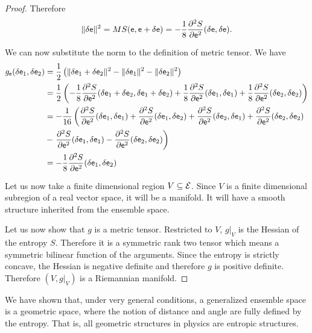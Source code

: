 \begin{proof}
Therefore
$$ \lVert \delta \mathsf{e} \rVert^2 = MS(\mathsf{e}, \mathsf{e} + \delta \mathsf{e}) = - \frac{1}{8} \frac{\partial^2 S}{\partial \mathsf{e}^2} (\delta \mathsf{e}, \delta \mathsf{e}).$$

We can now substitute the norm to the definition of metric tensor. We have
\begin{equation}
	\begin{aligned}
		g_{\mathsf{e}}(\delta \mathsf{e}_1, \delta \mathsf{e}_2 ) &= \frac{1}{2} \left( \lVert \delta \mathsf{e}_1 + \delta \mathsf{e}_2 \rVert^2 - \lVert \delta \mathsf{e}_1 \rVert^2 - \lVert \delta \mathsf{e}_2 \rVert^2 \right) \\
		&= \frac{1}{2} \left( - \frac{1}{8} \frac{\partial^2 S}{\partial \mathsf{e}^2} (\delta \mathsf{e}_1 + \delta \mathsf{e}_2, \delta \mathsf{e}_1 + \delta \mathsf{e}_2) + \frac{1}{8} \frac{\partial^2 S}{\partial \mathsf{e}^2} (\delta \mathsf{e}_1, \delta \mathsf{e}_1) +\frac{1}{8} \frac{\partial^2 S}{\partial \mathsf{e}^2} (\delta \mathsf{e}_2, \delta \mathsf{e}_2) \right) \\
		&= - \frac{1}{16} \left(  \frac{\partial^2 S}{\partial \mathsf{e}^2} (\delta \mathsf{e}_1, \delta \mathsf{e}_1) + \frac{\partial^2 S}{\partial \mathsf{e}^2} (\delta \mathsf{e}_1, \delta \mathsf{e}_2) + \frac{\partial^2 S}{\partial \mathsf{e}^2} (\delta \mathsf{e}_2, \delta \mathsf{e}_1) + \frac{\partial^2 S}{\partial \mathsf{e}^2} (\delta \mathsf{e}_2, \delta \mathsf{e}_2) \right. \\
		&-  \left. \frac{\partial^2 S}{\partial \mathsf{e}^2} (\delta \mathsf{e}_1, \delta \mathsf{e}_1) - \frac{\partial^2 S}{\partial \mathsf{e}^2} (\delta \mathsf{e}_2, \delta \mathsf{e}_2) \right) \\
		&= - \frac{1}{8} \frac{\partial^2 S}{\partial \mathsf{e}^2} (\delta \mathsf{e}_1, \delta \mathsf{e}_2) \\
	\end{aligned}
\end{equation}

	Let us now take a finite dimensional region $V \subseteq \mathcal{E}$. Since $V$ is a finite dimensional subregion of a real vector space, it will be a manifold. It will have a smooth structure inherited from the ensemble space.
	
	Let us now show that $g$ is a metric tensor. Restricted to $V$, $g|_V$ is the Hessian of the entropy $S$. Therefore it is a symmetric rank two tensor which means a symmetric bilinear function of the arguments. Since the entropy is strictly concave, the Hessian is negative definite and therefore $g$ is positive definite. Therefore $(V, g|_V)$ is a Riemannian manifold.
\end{proof}

\begin{remark}
	We have shown that, under very general conditions, a generalized ensemble space is a geometric space, where the notion of distance and angle are fully defined by the entropy. That is, all geometric structures in physics are entropic structures.
\end{remark}


